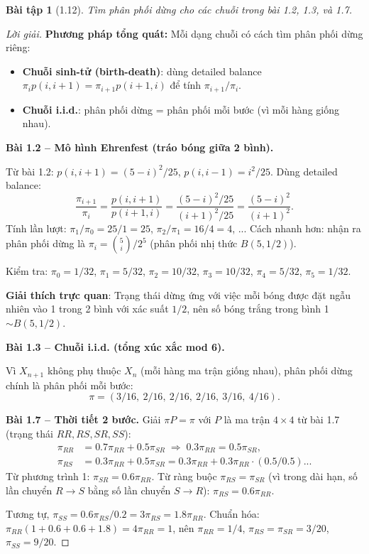 \documentclass[8pt,a4paper]{article}
\newtheorem{exercise}{Bài tập}
\newenvironment{solution}{\begin{proof}[Lời giải]}{\end{proof}}
\begin{document}
\begin{exercise}[1.12]
Tìm phân phối dừng cho các chuỗi trong bài 1.2, 1.3, và 1.7.
\end{exercise}
\begin{solution}
\textbf{Phương pháp tổng quát:} Mỗi dạng chuỗi có cách tìm phân phối dừng riêng:
\begin{itemize}
  \item \textbf{Chuỗi sinh-tử (birth-death)}: dùng detailed balance $\pi_i p(i,i+1) = \pi_{i+1} p(i+1,i)$ để tính $\pi_{i+1}/\pi_i$.
  \item \textbf{Chuỗi i.i.d.}: phân phối dừng = phân phối mỗi bước (vì mỗi hàng giống nhau).
\end{itemize}

\textbf{Bài 1.2 -- Mô hình Ehrenfest (tráo bóng giữa 2 bình).}

Từ bài 1.2: $p(i,i+1) = (5-i)^2/25$, $p(i,i-1) = i^2/25$. Dùng detailed balance:
\[
  \frac{\pi_{i+1}}{\pi_i} = \frac{p(i,i+1)}{p(i+1,i)} = \frac{(5-i)^2/25}{(i+1)^2/25} = \frac{(5-i)^2}{(i+1)^2}.
\]
Tính lần lượt: $\pi_1/\pi_0 = 25/1 = 25$, $\pi_2/\pi_1 = 16/4 = 4$, ... Cách nhanh hơn: nhận ra phân phối dừng là $\pi_i = \binom{5}{i}/2^5$ (phân phối nhị thức $B(5,1/2)$).

Kiểm tra: $\pi_0 = 1/32$, $\pi_1 = 5/32$, $\pi_2 = 10/32$, $\pi_3 = 10/32$, $\pi_4 = 5/32$, $\pi_5 = 1/32$.

\textbf{Giải thích trực quan}: Trạng thái dừng ứng với việc mỗi bóng được đặt ngẫu nhiên vào 1 trong 2 bình với xác suất $1/2$, nên số bóng trắng trong bình 1 $\sim B(5, 1/2)$.

\textbf{Bài 1.3 -- Chuỗi i.i.d. (tổng xúc xắc mod 6).}

Vì $X_{n+1}$ không phụ thuộc $X_n$ (mỗi hàng ma trận giống nhau), phân phối dừng chính là phân phối mỗi bước:
\[
  \pi = (3/16,\ 2/16,\ 2/16,\ 2/16,\ 3/16,\ 4/16).
\]

\textbf{Bài 1.7 -- Thời tiết 2 bước.}
Giải $\pi P = \pi$ với $P$ là ma trận $4\times 4$ từ bài 1.7 (trạng thái $RR, RS, SR, SS$):
\begin{align*}
  \pi_{RR} &= 0.7\pi_{RR} + 0.5\pi_{SR} \;\Rightarrow\; 0.3\pi_{RR} = 0.5\pi_{SR}, \\
  \pi_{RS} &= 0.3\pi_{RR} + 0.5\pi_{SR} = 0.3\pi_{RR} + 0.3\pi_{RR} \cdot (0.5/0.5)...
\end{align*}
Từ phương trình 1: $\pi_{SR} = 0.6\pi_{RR}$. Từ ràng buộc $\pi_{RS} = \pi_{SR}$ (vì trong dài hạn, số lần chuyển $R\to S$ bằng số lần chuyển $S\to R$): $\pi_{RS} = 0.6\pi_{RR}$.

Tương tự, $\pi_{SS} = 0.6\pi_{RS}/0.2 = 3\pi_{RS} = 1.8\pi_{RR}$. Chuẩn hóa: $\pi_{RR}(1 + 0.6 + 0.6 + 1.8) = 4\pi_{RR} = 1$, nên $\pi_{RR} = 1/4$, $\pi_{RS} = \pi_{SR} = 3/20$, $\pi_{SS} = 9/20$.
\end{solution}
\end{document}
